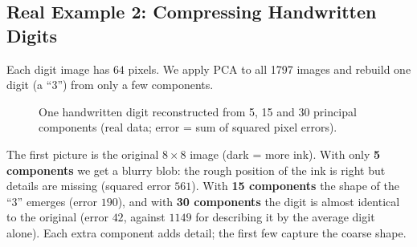 \subsection{Real Example 2: Compressing Handwritten Digits}

Each digit image has $64$ pixels. We apply PCA to all 1797 images and rebuild one digit (a ``3'') from only a few components.

\begin{figure}[!htbp]
\centering
{}
\caption{One handwritten digit reconstructed from 5, 15 and 30 principal components (real data; error = sum of squared pixel errors).}\label{fig:digitrec}
\end{figure}

\begin{explain}
The first picture is the original $8\times8$ image (dark = more ink). With only \textbf{5 components} we get a blurry blob: the rough position of the ink is right but details are missing (squared error $561$). With \textbf{15 components} the shape of the ``3'' emerges (error $190$), and with \textbf{30 components} the digit is almost identical to the original (error $42$, against $1149$ for describing it by the average digit alone). Each extra component adds detail; the first few capture the coarse shape.
\end{explain}

